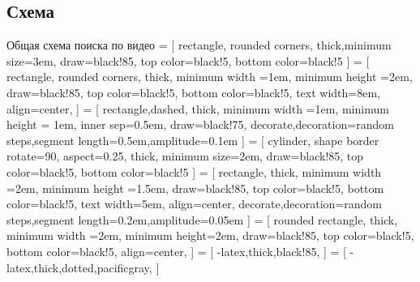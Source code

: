 
\subsection{Схема}

\begin{frame}{Общая схема поиска по видео}
    \sf\scriptsize
     = [
        rectangle, rounded corners,
        thick,minimum size=3em,
        draw=black!85,
        top color=black!5,
        bottom color=black!5
    ]
     = [
        rectangle, rounded corners,
        thick,
        minimum width =1em,
        minimum height =2em,
        draw=black!85,
        top color=black!5,
        bottom color=black!5,
        text width=8em,
        align=center,
    ]
     = [
        rectangle,dashed,
        thick,
        minimum width =1em,
        minimum height = 1em,
        inner sep=0.5em,
        draw=black!75,
        decorate,decoration={random steps,segment length=0.5em,amplitude=0.1em}
    ]
     = [
        cylinder,  shape border rotate=90,
        aspect=0.25,
        thick,
        minimum size=2em,
        draw=black!85,
        top color=black!5,
        bottom color=black!5
    ]
     = [
        rectangle,
        thick,
        minimum width =2em,
        minimum height =1.5em,
        draw=black!85,
        top color=black!5,
        bottom color=black!5,
        text width=5em,
        align=center,
        decorate,decoration={random steps,segment length=0.2em,amplitude=0.05em}
    ]
     = [
        rounded  rectangle,
        thick,
        minimum width =2em,
        minimum height=2em,
        draw=black!85,
        top color=black!5,
        bottom color=black!5,
        align=center,
    ]
     = [
        -latex,thick,black!85,
    ]
     = [
        -latex,thick,dotted,pacificgray,
    ]
    \begin{center}
\end{center}
\end{frame}
